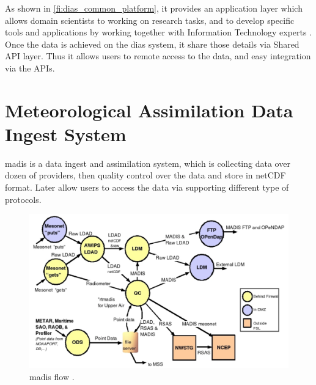 As shown in \cref{fi:dias_common_platform}, it provides an application layer which allows domain scientists to working on research tasks, and to develop specific tools and applications by working together with Information Technology experts \cite{Kawasaki2018DataReduction}. Once the data is achieved on the \acrshort{dias} system, it share those details via Shared API layer. Thus it allows users to remote access to the data, and easy integration via the APIs.



\section{Meteorological Assimilation Data Ingest System}
\label{se:madis}
\acrfull{madis} is a data ingest and assimilation system, which is collecting data over dozen of providers, then quality control over the data and store in \acrshort{netCDF} format. Later allow users to access the data via supporting different type of protocols.

\begin{figure}[htp]
    \centering
    \includegraphics[width=1\textwidth]{lit/other/madis_flow.png}
    \caption[\acrshort{madis} flow]{\acrshort{madis} flow \cite{Macdermaid2005ARCHITECTUREP2.39}.}
    \label{fi:madis_flow}
\end{figure}


